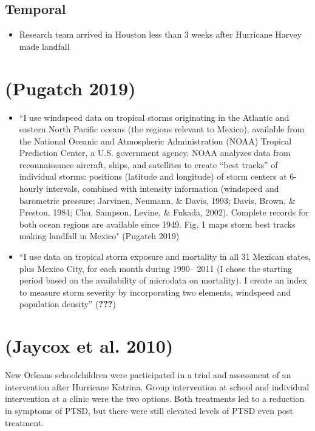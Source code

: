 \documentclass[
]{article}
\providecommand{\tightlist}{%
  \setlength{\itemsep}{0pt}\setlength{\parskip}{0pt}}
\begin{document}
\hypertarget{temporal}{%
\subsection{Temporal}\label{temporal}}

\begin{itemize}
\tightlist
\item
  Research team arrived in Houston less than 3 weeks after Hurricane
  Harvey made landfall
\end{itemize}

\hypertarget{pugatch2019tropical}{%
\section{(Pugatch 2019)}\label{pugatch2019tropical}}

\begin{itemize}
\tightlist
\item
  ``I use windspeed data on tropical storms originating in the Atlantic
  and eastern North Pacific oceans (the regions relevant to Mexico),
  available from the National Oceanic and Atmospheric Administration
  (NOAA) Tropical Prediction Center, a U.S. government agency. NOAA
  analyzes data from reconnaissance aircraft, ships, and satellites to
  create ``best tracks'' of individual storms: positions (latitude and
  longitude) of storm centers at 6-hourly intervals, combined with
  intensity information (windspeed and barometric pressure; Jarvinen,
  Neumann, \& Davis, 1993; Davis, Brown, \& Preston, 1984; Chu, Sampson,
  Levine, \& Fukada, 2002). Complete records for both ocean regions are
  available since 1949. Fig. 1 maps storm best tracks making landfall in
  Mexico" (Pugatch 2019)
\item
  ``I use data on tropical storm exposure and mortality in all 31
  Mexican states, plus Mexico City, for each month during 1990-- 2011 (I
  chose the starting period based on the availability of microdata on
  mortality). I create an index to measure storm severity by
  incorporating two elements, windspeed and population density''
  ({\textbf{???}})
\end{itemize}

\hypertarget{jaycox2010children}{%
\section{(Jaycox et al. 2010)}\label{jaycox2010children}}

New Orleans schoolchildren were participated in a trial and assessment
of an intervention after Hurricane Katrina. Group intervention at school
and individual intervention at a clinic were the two options. Both
treatments led to a reduction in symptoms of PTSD, but there were still
elevated levels of PTSD even post treatment.
\end{document}
